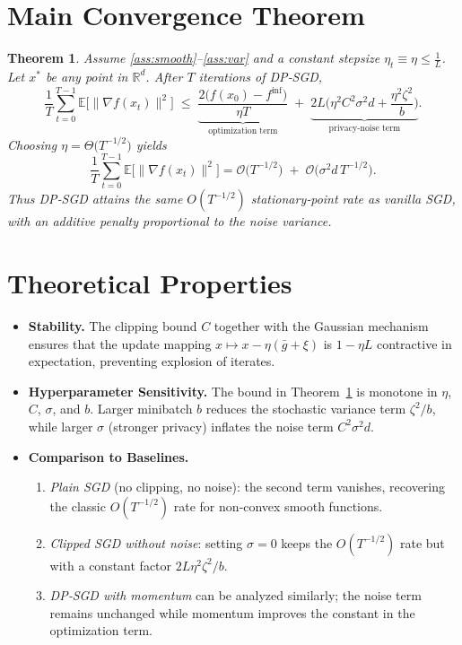 \documentclass{article}
\newtheorem{theorem}{Theorem}
\newcommand{\EE}{\mathbb{E}}
\newcommand{\RR}{\mathbb{R}}
\newcommand{\grad}{\nabla}
\begin{document}
\section*{Main Convergence Theorem}
\begin{theorem}\label{thm:main}
Assume \ref{ass:smooth}–\ref{ass:var} and a constant stepsize $\eta_{t}\equiv\eta\le \frac{1}{L}$. Let $x^{*}$ be any point in $\RR^{d}$. After $T$ iterations of DP‑SGD,
\[
\frac{1}{T}\sum_{t=0}^{T-1}\EE\!\bigl[\|\grad f(x_{t})\|^{2}\bigr]\;\le\;
\underbrace{\frac{2\bigl(f(x_{0})-f^{\inf}\bigr)}{\eta T}}_{\text{optimization term}}
\;+\;
\underbrace{2L\bigl(\eta^{2}C^{2}\sigma^{2}d + \frac{\eta^{2}\zeta^{2}}{b}\bigr)}_{\text{privacy‑noise term}} .
\]
Choosing $\eta = \Theta\!\bigl(T^{-1/2}\bigr)$ yields
\[
\frac{1}{T}\sum_{t=0}^{T-1}\EE\!\bigl[\|\grad f(x_{t})\|^{2}\bigr]=
\mathcal{O}\!\bigl(T^{-1/2}\bigr)
\;+\;
\mathcal{O}\!\bigl(\sigma^{2}d\,T^{-1/2}\bigr).
\]
Thus DP‑SGD attains the same $O(T^{-1/2})$ stationary‑point rate as vanilla SGD, with an additive penalty proportional to the noise variance.
\end{theorem}

\section*{Theoretical Properties}
\begin{itemize}
\item \textbf{Stability.} The clipping bound $C$ together with the Gaussian mechanism ensures that the update mapping $x\mapsto x-\eta(\bar g+\xi)$ is $1-\eta L$ contractive in expectation, preventing explosion of iterates.
\item \textbf{Hyperparameter Sensitivity.} The bound in Theorem~\ref{thm:main} is monotone in $\eta$, $C$, $\sigma$, and $b$. Larger minibatch $b$ reduces the stochastic variance term $\zeta^{2}/b$, while larger $\sigma$ (stronger privacy) inflates the noise term $C^{2}\sigma^{2}d$.
\item \textbf{Comparison to Baselines.}
    \begin{enumerate}
    \item \emph{Plain SGD} (no clipping, no noise): the second term vanishes, recovering the classic $O(T^{-1/2})$ rate for non‑convex smooth functions.
    \item \emph{Clipped SGD without noise}: setting $\sigma=0$ keeps the $O(T^{-1/2})$ rate but with a constant factor $2L\eta^{2}\zeta^{2}/b$.
    \item \emph{DP‑SGD with momentum} can be analyzed similarly; the noise term remains unchanged while momentum improves the constant in the optimization term.
    \end{enumerate}
\end{itemize}
\end{document}
